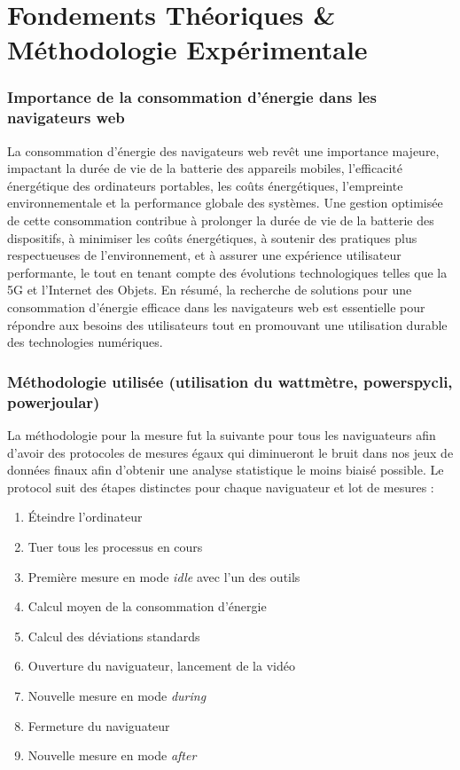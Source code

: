 \documentclass[12pt, a4paper]{report}
\begin{document}
\chapter{\centering Fondements Théoriques \& Méthodologie Expérimentale}

\subsection{Importance de la consommation d'énergie dans les navigateurs web}

La consommation d'énergie des navigateurs web revêt une importance majeure, impactant la durée de vie de la batterie des appareils mobiles, l'efficacité énergétique des ordinateurs portables, les coûts énergétiques, l'empreinte environnementale et la performance globale des systèmes. Une gestion optimisée de cette consommation contribue à prolonger la durée de vie de la batterie des dispositifs, à minimiser les coûts énergétiques, à soutenir des pratiques plus respectueuses de l'environnement, et à assurer une expérience utilisateur performante, le tout en tenant compte des évolutions technologiques telles que la 5G et l'Internet des Objets. En résumé, la recherche de solutions pour une consommation d'énergie efficace dans les navigateurs web est essentielle pour répondre aux besoins des utilisateurs tout en promouvant une utilisation durable des technologies numériques.

\subsection{Méthodologie utilisée (utilisation du wattmètre, powerspycli, powerjoular)}
La méthodologie pour la mesure fut la suivante pour tous les naviguateurs afin d'avoir des protocoles de mesures égaux qui diminueront le bruit dans nos jeux de données finaux afin d'obtenir une analyse statistique le moins biaisé possible. 
Le protocol suit des étapes distinctes pour chaque naviguateur et lot de mesures :
\begin{enumerate}
    \item Éteindre l'ordinateur 
    \item Tuer tous les processus en cours
    \item Première mesure en mode \textit{idle} avec l'un des outils
    \item Calcul moyen de la consommation d'énergie
    \item Calcul des déviations standards
    \item Ouverture du naviguateur, lancement de la vidéo
    \item Nouvelle mesure en mode \textit{during}
    \item Fermeture du naviguateur
    \item Nouvelle mesure en mode \textit{after}
    
\end{enumerate}
\end{document}
